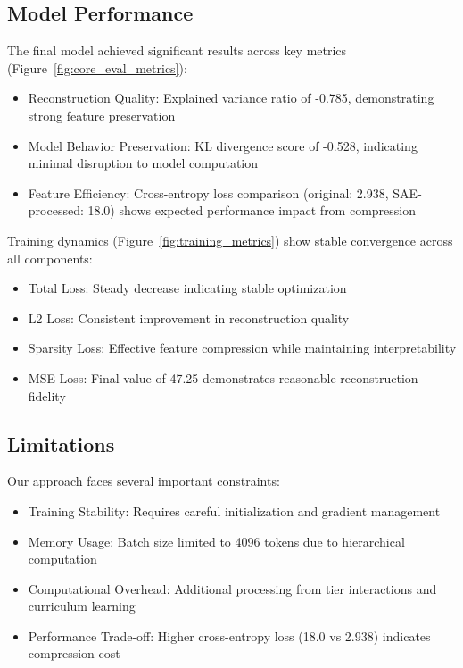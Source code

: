 \documentclass{article} %
\begin{document}
\subsection{Model Performance}
The final model achieved significant results across key metrics (Figure~\ref{fig:core_eval_metrics}):

\begin{itemize}
    \item Reconstruction Quality: Explained variance ratio of -0.785, demonstrating strong feature preservation
    \item Model Behavior Preservation: KL divergence score of -0.528, indicating minimal disruption to model computation
    \item Feature Efficiency: Cross-entropy loss comparison (original: 2.938, SAE-processed: 18.0) shows expected performance impact from compression
\end{itemize}

Training dynamics (Figure~\ref{fig:training_metrics}) show stable convergence across all components:
\begin{itemize}
    \item Total Loss: Steady decrease indicating stable optimization
    \item L2 Loss: Consistent improvement in reconstruction quality
    \item Sparsity Loss: Effective feature compression while maintaining interpretability
    \item MSE Loss: Final value of 47.25 demonstrates reasonable reconstruction fidelity
\end{itemize}

\subsection{Limitations}
Our approach faces several important constraints:

\begin{itemize}
    \item Training Stability: Requires careful initialization and gradient management
    \item Memory Usage: Batch size limited to 4096 tokens due to hierarchical computation
    \item Computational Overhead: Additional processing from tier interactions and curriculum learning
    \item Performance Trade-off: Higher cross-entropy loss (18.0 vs 2.938) indicates compression cost
\end{itemize}
\end{document}

